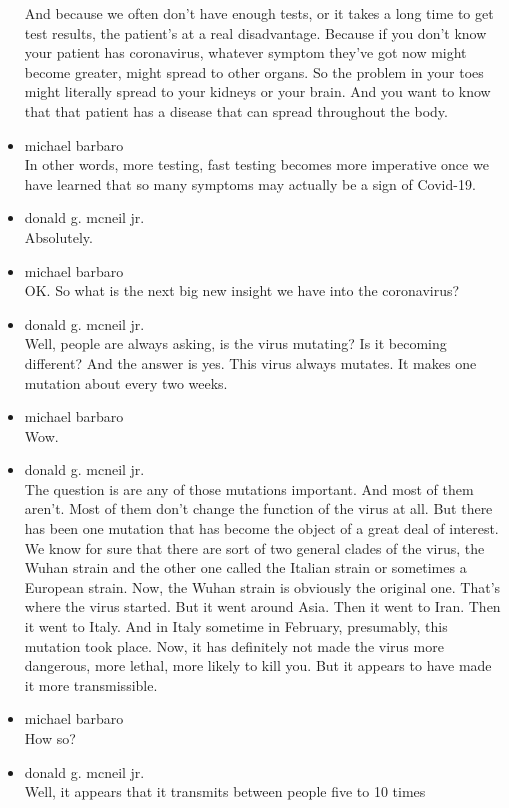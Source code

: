 \begin{itemize}
  And because we often don't have enough tests, or it takes a long time
  to get test results, the patient's at a real disadvantage. Because if
  you don't know your patient has coronavirus, whatever symptom they've
  got now might become greater, might spread to other organs. So the
  problem in your toes might literally spread to your kidneys or your
  brain. And you want to know that that patient has a disease that can
  spread throughout the body.
\item
  michael barbaro\\
  In other words, more testing, fast testing becomes more imperative
  once we have learned that so many symptoms may actually be a sign of
  Covid-19.
\item
  donald g. mcneil jr.\\
  Absolutely.
\item
  michael barbaro\\
  OK. So what is the next big new insight we have into the coronavirus?
\item
  donald g. mcneil jr.\\
  Well, people are always asking, is the virus mutating? Is it becoming
  different? And the answer is yes. This virus always mutates. It makes
  one mutation about every two weeks.
\item
  michael barbaro\\
  Wow.
\item
  donald g. mcneil jr.\\
  The question is are any of those mutations important. And most of them
  aren't. Most of them don't change the function of the virus at all.
  But there has been one mutation that has become the object of a great
  deal of interest. We know for sure that there are sort of two general
  clades of the virus, the Wuhan strain and the other one called the
  Italian strain or sometimes a European strain. Now, the Wuhan strain
  is obviously the original one. That's where the virus started. But it
  went around Asia. Then it went to Iran. Then it went to Italy. And in
  Italy sometime in February, presumably, this mutation took place. Now,
  it has definitely not made the virus more dangerous, more lethal, more
  likely to kill you. But it appears to have made it more transmissible.
\item
  michael barbaro\\
  How so?
\item
  donald g. mcneil jr.\\
  Well, it appears that it transmits between people five to 10 times

\end{itemize}
